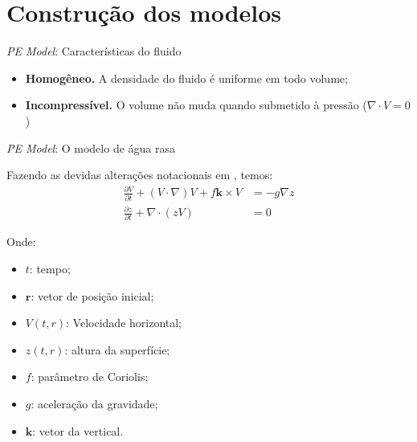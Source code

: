 \section{Construção dos modelos} 


\begin{frame}{\textit{PE Model}: Características do fluido}
	\begin{itemize}
		\item \textbf{Homogêneo.} A densidade do fluido é uniforme em todo volume;
		\item \textbf{Incompressível.} O volume não muda quando submetido à pressão ($\nabla \cdot V = 0$)
	\end{itemize}
\end{frame}


\begin{frame}{\textit{PE Model}: O modelo de água rasa}
		
	Fazendo as devidas alterações notacionais em \cite{salmon1998}, temos:
	\begin{align}
		\frac{\partial V}{\partial t} + (V \cdot \nabla)V + f \mathbf{k} \times V & = -g \nabla z \label{eq:agua-rasa-1} \\
		\frac{\partial z}{\partial t} + \nabla \cdot (z V)                        & = 0 \label{eq:agua-rasa-2}           
	\end{align}
		
	\begin{small}
		Onde:
		\begin{multicols}{2}
			\begin{itemize}
				\item $t$: tempo;
				\item $\mathbf{r}$: vetor de posição inicial;
				\item $V(t,r)$: Velocidade horizontal;
				\item $z(t,r)$: altura da superfície;
				\item $f$: parâmetro de Coriolis;
				\item $g$: aceleração da gravidade;
				\item $\mathbf{k}$: vetor da vertical.
			\end{itemize}
		\end{multicols}
	\end{small}
\end{frame}


